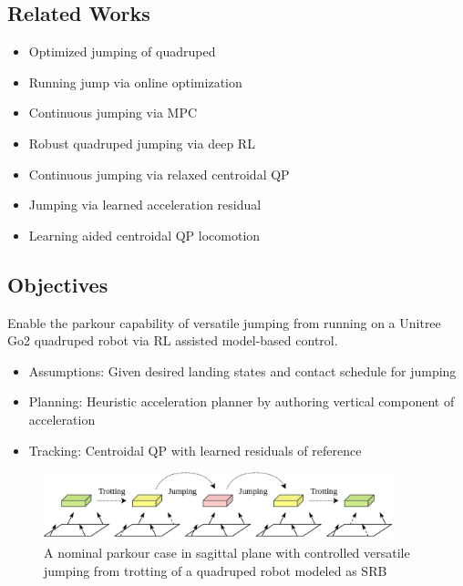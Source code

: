 \documentclass[11pt, conference]{IEEEtran}
\theoremstyle{definition} %
\begin{document}
\subsection{Related Works}

\begin{itemize}
    \item Optimized jumping of quadruped\cite{nguyen2019optimized}
    \item Running jump via online optimization\cite{chignoli2021online}
    \item Continuous jumping via MPC\cite{nguyen2022continuous}
    \item Robust quadruped jumping via deep RL\cite{bellegarda2020robust}
    \item Continuous jumping via relaxed centroidal QP\cite{yang2023cajun}
    \item Jumping via learned acceleration residual\cite{yang2023continuous}
    \item Learning aided centroidal QP locomotion\cite{xie2022glide}
\end{itemize}

\subsection{Objectives}
Enable the parkour capability of versatile jumping from running on a Unitree Go2 quadruped robot via RL assisted model-based control.
\begin{itemize}
    \item {Assumptions}: Given desired landing states and contact schedule for jumping
    \item {Planning}: Heuristic acceleration planner by authoring vertical component of acceleration
    \item {Tracking}: Centroidal QP with learned residuals of reference
    
\end{itemize}


\begin{figure}
    \centering
    \includegraphics[width=0.9\textwidth]{figures/parkour.png}
    \caption{A nominal parkour case in sagittal plane with controlled versatile jumping from trotting of a quadruped robot modeled as SRB}
    \label{fig:parkour}
\end{figure}
\end{document}
